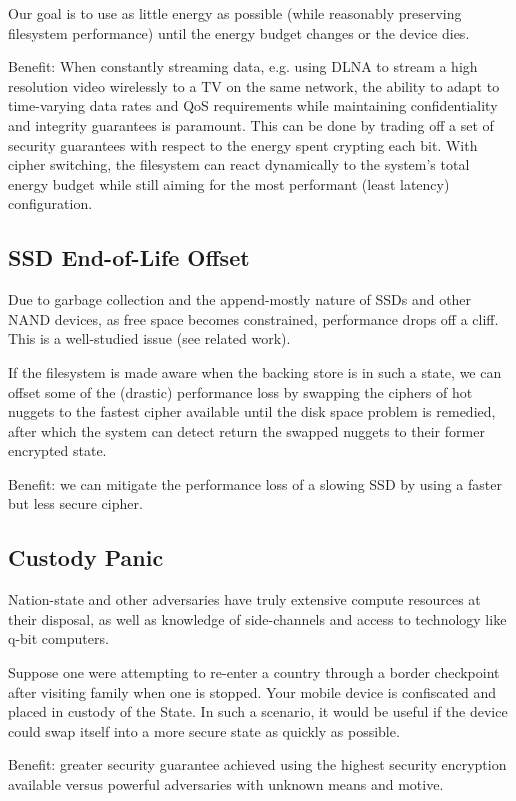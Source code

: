 Our goal is to use as little energy as possible (while reasonably preserving
filesystem performance) until the energy budget changes or the device dies.

Benefit: When constantly streaming data, e.g. using DLNA to stream a high
resolution video wirelessly to a TV on the same network, the ability to adapt to
time-varying data rates and QoS requirements while maintaining confidentiality
and integrity guarantees is paramount. This can be done by trading off a set of
security guarantees with respect to the energy spent crypting each bit. With
cipher switching, the filesystem can react dynamically to the system's total
energy budget while still aiming for the most performant (least latency)
configuration.

\subsection{SSD End-of-Life Offset}

Due to garbage collection and the append-mostly nature of SSDs and other NAND
devices, as free space becomes constrained, performance drops off a cliff. This
is a well-studied issue (see related work).

If the filesystem is made aware when the backing store is in such a state, we
can offset some of the (drastic) performance loss by swapping the ciphers of hot
nuggets to the fastest cipher available until the disk space problem is
remedied, after which the system can detect return the swapped nuggets to their
former encrypted state.

Benefit: we can mitigate the performance loss of a slowing SSD by using a faster
but less secure cipher.

\subsection{Custody Panic}

Nation-state and other adversaries have truly extensive compute resources at
their disposal, as well as knowledge of side-channels and access to technology
like q-bit computers.

Suppose one were attempting to re-enter a country through a border checkpoint
after visiting family when one is stopped. Your mobile device is confiscated and
placed in custody of the State. In such a scenario, it would be useful if the
device could swap itself into a more secure state as quickly as possible.

Benefit: greater security guarantee achieved using the highest security
encryption available versus powerful adversaries with unknown means and motive.
